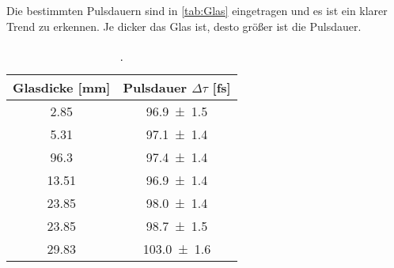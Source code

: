     Die bestimmten Pulsdauern sind in \autoref{tab:Glas} eingetragen und es ist ein klarer Trend zu erkennen.
    Je dicker das Glas ist, desto größer ist die Pulsdauer.
    \begin{table}[h]
        \centering
        \caption{.}
        \label{tab:Glas}
        \begin{tabular}{c c}
        \toprule
        {Glasdicke [mm]} & {Pulsdauer $\Delta \tau$ [fs]}  \\
        \midrule
        \num{2.85}     &   \num{96,9\pm1,5}  \\
        \num{5.31}     &   \num{97,1\pm1,4}  \\
        \num{96,3}     &   \num{97,4\pm1,4}  \\
        \num{13,51}    &   \num{96,9\pm1,4}  \\
        \num{23,85}    &   \num{98,0\pm1,4}  \\
        \num{23,85}    &   \num{98,7\pm1,5}  \\
        \num{29,83}    &   \num{103,0\pm1,6} \\
        \bottomrule
        \end{tabular}
    \end{table}





